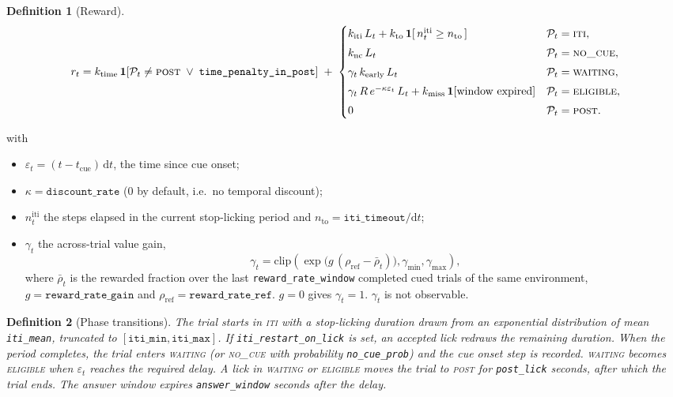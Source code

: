 \documentclass[11pt]{article}
\newtheorem{definition}{Definition}
\newcommand{\1}{\mathbf{1}}
\begin{document}
\begin{definition}[Reward]
\begin{equation}
  r_t = k_{\mathrm{time}}\,\1[\mathcal{P}_t \ne \textsc{post} \;\vee\; \texttt{time\_penalty\_in\_post}]
  \;+\;
  \begin{cases}
    k_{\mathrm{iti}}\, L_t + k_{\mathrm{to}}\,\1[\,n^{\mathrm{iti}}_t \ge n_{\mathrm{to}}\,]
      & \mathcal{P}_t = \textsc{iti},\\[3pt]
    k_{\mathrm{nc}}\, L_t
      & \mathcal{P}_t = \textsc{no\_cue},\\[3pt]
    \gamma_t\, k_{\mathrm{early}}\, L_t
      & \mathcal{P}_t = \textsc{waiting},\\[3pt]
    \gamma_t\, R\, e^{-\kappa \varepsilon_t}\, L_t + k_{\mathrm{miss}}\,\1[\text{window expired}]
      & \mathcal{P}_t = \textsc{eligible},\\[3pt]
    0 & \mathcal{P}_t = \textsc{post}.
  \end{cases}
  \label{eq:reward}
\end{equation}
\end{definition}

\noindent with
\begin{itemize}
  \item $\varepsilon_t = (t - t_{\mathrm{cue}})\,\mathrm{d}t$, the time since cue onset;
  \item $\kappa = \texttt{discount\_rate}$ (0 by default, i.e.\ no temporal discount);
  \item $n^{\mathrm{iti}}_t$ the steps elapsed in the current stop-licking period and
        $n_{\mathrm{to}} = \texttt{iti\_timeout}/\mathrm{d}t$;
  \item $\gamma_t$ the across-trial value gain,
        \begin{equation}
          \gamma_t = \mathrm{clip}\!\left(\exp\bigl(g\,(\rho_{\mathrm{ref}} - \bar\rho_t)\bigr),
                      \gamma_{\min}, \gamma_{\max}\right),
        \end{equation}
        where $\bar\rho_t$ is the rewarded fraction over the last \texttt{reward\_rate\_window}
        completed cued trials of the same environment, $g = \texttt{reward\_rate\_gain}$ and
        $\rho_{\mathrm{ref}} = \texttt{reward\_rate\_ref}$. $g = 0$ gives $\gamma_t = 1$.
        $\gamma_t$ is not observable.
\end{itemize}

\begin{definition}[Phase transitions]
The trial starts in \textsc{iti} with a stop-licking duration drawn from an exponential
distribution of mean \texttt{iti\_mean}, truncated to $[\texttt{iti\_min}, \texttt{iti\_max}]$.
If \texttt{iti\_restart\_on\_lick} is set, an accepted lick redraws the remaining duration.
When the period completes, the trial enters \textsc{waiting} (or \textsc{no\_cue} with
probability \texttt{no\_cue\_prob}) and the cue onset step is recorded. \textsc{waiting}
becomes \textsc{eligible} when $\varepsilon_t$ reaches the required delay. A lick in
\textsc{waiting} or \textsc{eligible} moves the trial to \textsc{post} for
\texttt{post\_lick} seconds, after which the trial ends. The answer window expires
\texttt{answer\_window} seconds after the delay.
\end{definition}
\end{document}
